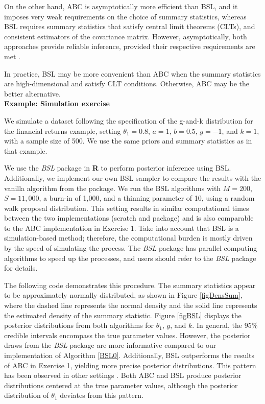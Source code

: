 On the other hand, ABC is asymptotically more efficient than BSL, and it imposes very weak requirements on the choice of summary statistics, whereas BSL requires summary statistics that satisfy central limit theorems (CLTs), and consistent estimators of the covariance matrix. However, asymptotically, both approaches provide reliable inference, provided their respective requirements are met \cite{martin2024approximating}.  

In practice, BSL may be more convenient than ABC when the summary statistics are high-dimensional and satisfy CLT conditions. Otherwise, ABC may be the better alternative.\\    

\textbf{Example: Simulation exercise}

We simulate a dataset following the specification of the g-and-k distribution for the financial returns example, setting $\theta_1 = 0.8$, $a = 1$, $b = 0.5$, $g = -1$, and $k = 1$, with a sample size of 500. We use the same priors and summary statistics as in that example.

We use the \textit{BSL} package in \textbf{R} to perform posterior inference using BSL. Additionally, we implement our own BSL sampler to compare the results with the vanilla algorithm from the package. We run the BSL algorithms with $M=200$, $S=11,000$, a burn-in of 1,000, and a thinning parameter of 10, using a random walk proposal distribution. This setting results in similar computational times between the two implementations (scratch and package) and is also comparable to the ABC implementation in Exercise 1. Take into account that BSL is a simulation-based method; therefore, the computational burden is mostly driven by the speed of simulating the process. The \textit{BSL} package has parallel computing algorithms to speed up the processes, and users should refer to the \textit{BSL} package for details.

The following code demonstrates this procedure. The summary statistics appear to be approximately normally distributed, as shown in Figure \ref{figDensSum}, where the dashed line represents the normal density and the solid line represents the estimated density of the summary statistic. Figure \ref{figBSL} displays the posterior distributions from both algorithms for $\theta_1$, $g$, and $k$. In general, the 95\% credible intervals encompass the true parameter values. However, the posterior draws from the \textit{BSL} package are more informative compared to our implementation of Algorithm \ref{BSL0}. Additionally, BSL outperforms the results of ABC in Exercise 1, yielding more precise posterior distributions. This pattern has been observed in other settings \cite{drovandi2022comparison,martin2024approximating}. Both ABC and BSL produce posterior distributions centered at the true parameter values, although the posterior distribution of $\theta_1$ deviates from this pattern.

